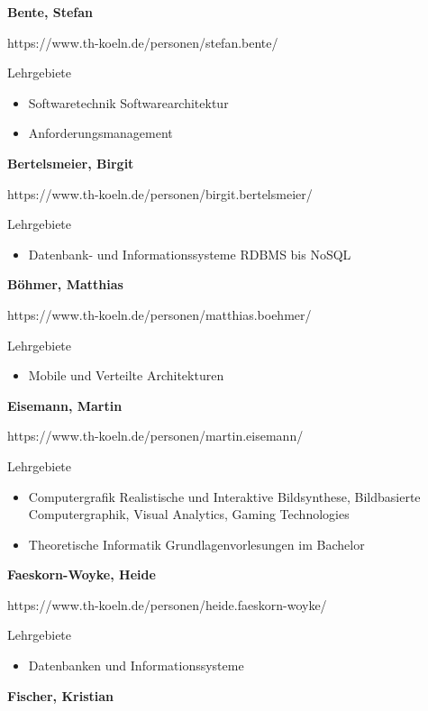 \textbf{Bente, Stefan}

https://www.th-koeln.de/personen/stefan.bente/

Lehrgebiete

\begin{itemize}
\tightlist
\item
  Softwaretechnik Softwarearchitektur
\item
  Anforderungsmanagement
\end{itemize}

\textbf{Bertelsmeier, Birgit}

https://www.th-koeln.de/personen/birgit.bertelsmeier/

Lehrgebiete

\begin{itemize}
\tightlist
\item
  Datenbank- und Informationssysteme RDBMS bis NoSQL
\end{itemize}

\textbf{Böhmer, Matthias}

https://www.th-koeln.de/personen/matthias.boehmer/

Lehrgebiete

\begin{itemize}
\tightlist
\item
  Mobile und Verteilte Architekturen
\end{itemize}

\textbf{Eisemann, Martin}

https://www.th-koeln.de/personen/martin.eisemann/

Lehrgebiete

\begin{itemize}
\tightlist
\item
  Computergrafik Realistische und Interaktive Bildsynthese, Bildbasierte
  Computergraphik, Visual Analytics, Gaming Technologies
\item
  Theoretische Informatik Grundlagenvorlesungen im Bachelor
\end{itemize}

\textbf{Faeskorn-Woyke, Heide}

https://www.th-koeln.de/personen/heide.faeskorn-woyke/

Lehrgebiete

\begin{itemize}
\tightlist
\item
  Datenbanken und Informationssysteme
\end{itemize}

\textbf{Fischer, Kristian}

